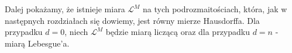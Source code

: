 Dalej pokażamy, że istnieje miara $\mathcal{L}^M$ na tych podrozmaitościach, która, jak w następnych rozdziałach się dowiemy, jest równy mierze Hausdorffa.
Dla przypadku $d=0$, niech $\mathcal{L}^M$ będzie miarą liczącą oraz dla przypadku $d=n$ - miarą Lebesgue'a.